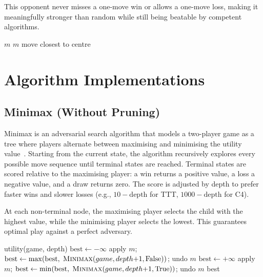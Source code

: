 \documentclass[12pt, a4paper]{article}
\begin{document}
This opponent never misses a one-move win or allows a one-move loss, making it meaningfully
stronger than random while still being beatable by competent algorithms.

\begin{algorithm}[H]
\caption{Default Opponent Strategy}
\begin{algorithmic}[1]
         \Return $m$ \EndIf
    \EndFor
         \Return $m$  \EndIf
    \EndFor
    \State \Return move closest to centre
\EndFunction
\end{algorithmic}
\end{algorithm}


\section{Algorithm Implementations}

\subsection{Minimax (Without Pruning)}

Minimax is an adversarial search algorithm that models a two-player game as a tree where
players alternate between maximising and minimising the utility
value~\cite{russell2010,vonneumann1944}. Starting from the current state, the algorithm
recursively explores every possible move sequence until terminal states are reached. Terminal
states are scored relative to the maximising player: a win returns a positive value, a loss a
negative value, and a draw returns zero. The score is adjusted by depth to prefer faster wins
and slower losses (e.g., $10 - \text{depth}$ for TTT, $1000 - \text{depth}$ for C4).

At each non-terminal node, the maximising player selects the child with the highest value,
while the minimising player selects the lowest. This guarantees optimal play against a perfect
adversary.

\begin{algorithm}[H]
\caption{Minimax (No Pruning)}
\begin{algorithmic}[1]
        \State \Return utility(game, depth)
    \EndIf
        \State $\text{best} \leftarrow -\infty$
            \State apply $m$; \;
            $\text{best} \leftarrow \max(\text{best},\;\Call{Minimax}{game, depth{+}1, \text{False}})$;
            \; undo $m$
        \EndFor
    \Else
        \State $\text{best} \leftarrow +\infty$
            \State apply $m$; \;
            $\text{best} \leftarrow \min(\text{best},\;\Call{Minimax}{game, depth{+}1, \text{True}})$;
            \; undo $m$
        \EndFor
    \EndIf
    \State \Return best
\EndFunction
\end{algorithmic}
\end{algorithm}
\end{document}
